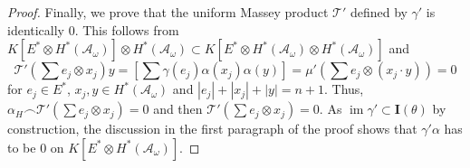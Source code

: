 \documentclass{article}
\theoremstyle{plain}
\theoremstyle{definition}
\theoremstyle{plain}
\DeclareMathOperator{\im}{im}
\numberwithin{equation}{section}
\begin{document}
\begin{proof}
Finally, we prove that the uniform Massey product $\mathcal{T}'$ defined by $\gamma'$ is identically 0. This follows from $K[E^*\otimes H^*(\mathcal{A}_{\omega})]\otimes H^*(\mathcal{A}_{\omega})\subset K[E^*\otimes H^*(\mathcal{A}_{\omega})\otimes H^*(\mathcal{A}_{\omega})]$ and
$$
\mathcal{T'}\left(\sum e_j\otimes x_j\right) y=\left[\sum\gamma(e_j)\alpha(x_j)\alpha(y)\right]=\mu'\left(\sum e_j\otimes (x_j\cdot y)\right)=0
$$
for $e_j\in E^*$, $x_j,y\in H^*(\mathcal{A}_{\omega})$ and $|e_j|+|x_j|+|y|=n+1$. Thus, $\alpha_H\frown \mathcal{T'}\left(\sum e_j\otimes x_j\right)=0$ and then $\mathcal{T'}\left(\sum e_j\otimes x_j\right)=0$. As $\im\gamma'\subset\mathbf{I}(\theta)$ by construction, the discussion in the first paragraph of the proof shows that $\gamma'\alpha$ has to be 0 on $K[E^*\otimes H^*(\mathcal{A}_{\omega})]$. 
\end{proof}
\end{document}
